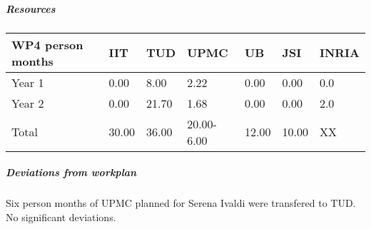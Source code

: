 
\subparagraph{Resources}

\begin{center}
\begin{tabular}{|C{1.5cm}|C{1.5cm}|C{1.5cm}|C{2cm}|C{2cm}|C{2cm}|C{2cm}|}
\hline
\footnotesize \textbf{WP4 person months}& \footnotesize \textbf{IIT}&\footnotesize \textbf{TUD}&\footnotesize \textbf{UPMC}& \footnotesize \textbf{UB} &\footnotesize \textbf{JSI} &\footnotesize \textbf{INRIA}\\ \hline
\footnotesize Year 1 &  0.00 & 8.00 & 2.22 & 0.00 & 0.00 & 0.0     \\  \hline
\footnotesize Year 2 &  0.00 & 21.70 & 1.68 & 0.00 & 0.00 & 2.0     \\  \hline
\footnotesize Total &  30.00 & 36.00 & 20.00-6.00 & 12.00 & 10.00 & XX \\ \hline
\end{tabular}
\end{center}

\subparagraph{Deviations from workplan} 
Six person months of UPMC planned for Serena Ivaldi were transfered to TUD. No significant deviations. 
